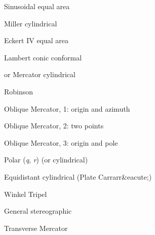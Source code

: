 \documentclass{article}
\begin{document}
\par 	{}	Sinusoidal equal area\par 

\par 	{}	Miller cylindrical\par 

\par 	{}	Eckert IV equal area\par 

\par 	{}	Lambert conic conformal\par 

\par 	{}or{\it }	Mercator cylindrical\par 

\par 	{}	Robinson\par 

\par 	{}	Oblique Mercator, 1:	origin and azimuth\par 

\par 	{}	Oblique Mercator, 2:	two points\par 

\par 	{}	Oblique Mercator, 3:	origin and pole\par 

\par 	{}	Polar ({\it q}, {\it r}) (or cylindrical)\par 

\par 	{}	Equidistant cylindrical (Plate Carrarr\&eacute;)\par 

\par 	{}	Winkel Tripel\par 

\par 	{}	General stereographic\par 

\par 	{}	Transverse Mercator\par 
\end{document}
